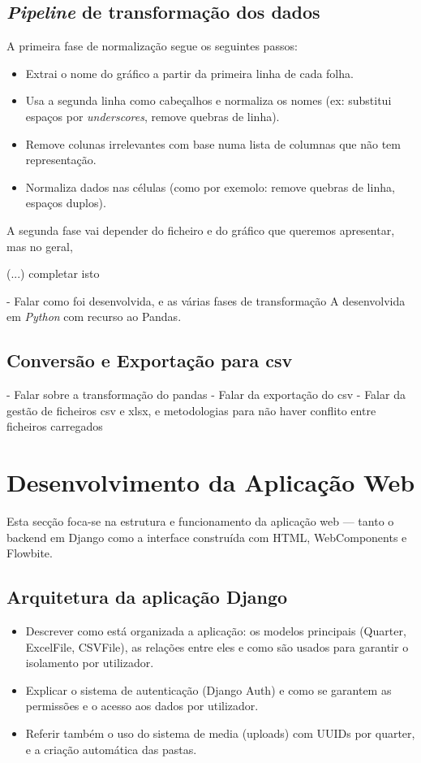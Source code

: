 \subsection{\textit{Pipeline} de transformação dos dados}
A primeira fase de normalização segue os seguintes passos:
\begin{itemize}
    \item Extrai o nome do gráfico a partir da primeira linha de cada folha.
    \item Usa a segunda linha como cabeçalhos e normaliza os nomes (ex: substitui espaços por \textit{underscores}, remove quebras de linha).
    \item Remove colunas irrelevantes com base numa lista de columnas que não tem representação.
    \item Normaliza dados nas células (como por exemolo: remove quebras de linha, espaços duplos).
\end{itemize}

A segunda fase vai depender do ficheiro e do gráfico que queremos apresentar, mas no geral,

(...) completar isto

- Falar como foi desenvolvida, e as várias fases  de transformação A desenvolvida em \textit{Python} com recurso ao Pandas. 


\subsection{Conversão e Exportação para \gls{csv}}
- Falar sobre a transformação do pandas\n
- Falar da exportação do \gls{csv}\n
- Falar da gestão de ficheiros  \gls{csv} e \gls{xlsx}, e metodologias para não haver conflito entre ficheiros carregados\n


\section{Desenvolvimento da Aplicação Web}

Esta secção foca-se na estrutura e funcionamento da aplicação web — tanto o backend em Django como a interface construída com HTML, WebComponents e Flowbite.
\subsection{Arquitetura da aplicação Django}

    \begin{itemize}
        \item Descrever como está organizada a aplicação: os modelos principais (Quarter, ExcelFile, CSVFile), as relações entre eles e como são usados para garantir o isolamento por utilizador.
        \item Explicar o sistema de autenticação (Django Auth) e como se garantem as permissões e o acesso aos dados por utilizador.
        \item Referir também o uso do sistema de media (uploads) com UUIDs por quarter, e a criação automática das pastas.
    \end{itemize}

